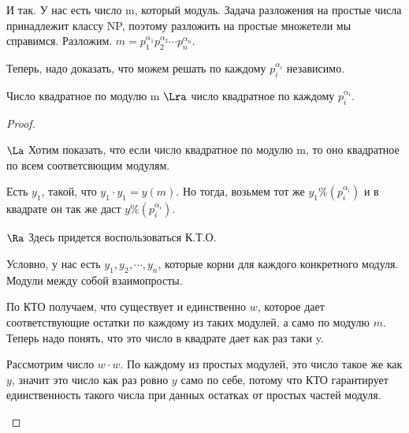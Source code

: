 	И так. У нас есть число m, который модуль. Задача разложения на простые числа принадлежит классу NP, поэтому разложить 
	на простые множетели мы справимся. Разложим. $m = p_1^{\alpha_1}p_2^{\alpha_2}\cdots p_n^{\alpha_n}$.

	Теперь, надо доказать, что можем решать по каждому $p_i^{\alpha_i}$ независимо. 
	\begin{lemma}
		Число квадратное по модулю m $\Lra$ число квадратное по каждому $p_i^{\alpha_i}$.
	\end{lemma}
	\begin{proof}
	        \begin{description}
	        \item $\La$
	        	Хотим показать, что если число квадратное по модулю 
	        	m, то оно квадратное по всем соответсвющим модулям. 

	        	Есть $y_1$, такой, что $y_1 \cdot y_1 = y(m)$. Но тогда, 
	        	возьмем тот же $y_1 \% (p_i^{\alpha_i})$ и в квадрате он 
	        	так же даст $y \% (p_i^{\alpha_i})$.
	        \item $\Ra$
	        	Здесь придется воспользоваться К.Т.О. 

	        	Условно, у нас есть $y_1, y_2, \cdots, y_n$, которые корни для 
	        	каждого конкретного модуля. Модули между собой взаимопросты. 

	        	По КТО получаем, что существует и единственно $w$, которое 
	        	дает соответствующие остатки по каждому из таких модулей, а само
	        	по модулю $m$. Теперь надо понять, что
	        	это число в квадрате дает как раз таки y.

	              	Рассмотрим число $w \cdot w$. По 
	              	каждому из простых модулей, это число такое же как $y$,
	              	значит это число как раз ровно $y$ само по себе, потому что
	              	КТО гарантирует единственность такого числа при данных остатках от 
	              	простых частей модуля. 
	        \end{description}
	\end{proof}

